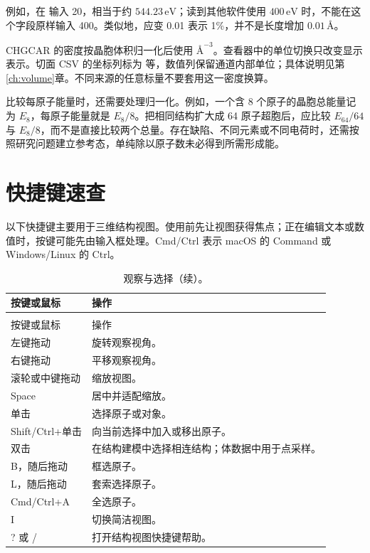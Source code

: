 例如，在  输入 20，相当于约 $544.23\,\mathrm{eV}$；读到其他软件使用 $400\,\mathrm{eV}$ 时，不能在这个字段原样输入 400。类似地，应变 0.01 表示 1\%，并不是长度增加 $0.01\,\text{\AA}$。

CHGCAR 的密度按晶胞体积归一化后使用 $\text{\AA}^{-3}$。查看器中的单位切换只改变显示表示。切面 CSV 的坐标列标为  等，数值列保留通道内部单位；具体说明见第\ref{ch:volume}章。不同来源的任意标量不要套用这一密度换算。

比较每原子能量时，还需要处理归一化。例如，一个含 8 个原子的晶胞总能量记为 $E_8$，每原子能量就是 $E_8/8$。把相同结构扩大成 64 原子超胞后，应比较 $E_{64}/64$ 与 $E_8/8$，而不是直接比较两个总量。存在缺陷、不同元素或不同电荷时，还需按照研究问题建立参考态，单纯除以原子数未必得到所需形成能。

\section{快捷键速查}

以下快捷键主要用于三维结构视图。使用前先让视图获得焦点；正在编辑文本或数值时，按键可能先由输入框处理。Cmd/Ctrl 表示 macOS 的 Command 或 Windows/Linux 的 Ctrl。

\begin{longtable}{>{\raggedright\arraybackslash}p{.37\linewidth}>{\raggedright\arraybackslash}p{}}
\caption{观察与选择。}\\
\toprule
按键或鼠标 & 操作 \\
\midrule
\endfirsthead
\caption[]{观察与选择（续）。}\\
\toprule
按键或鼠标 & 操作 \\
\midrule
\endhead
\bottomrule
\endfoot
\bottomrule
\endlastfoot
左键拖动 & 旋转观察视角。\\
右键拖动 & 平移观察视角。\\
滚轮或中键拖动 & 缩放视图。\\
Space & 居中并适配缩放。\\
单击 & 选择原子或对象。\\
Shift/Ctrl+单击 & 向当前选择中加入或移出原子。\\
双击 & 在结构建模中选择相连结构；体数据中用于点采样。\\
B，随后拖动 & 框选原子。\\
L，随后拖动 & 套索选择原子。\\
Cmd/Ctrl+A & 全选原子。\\
I & 切换简洁视图。\\
? 或 / & 打开结构视图快捷键帮助。\\
\end{longtable}

